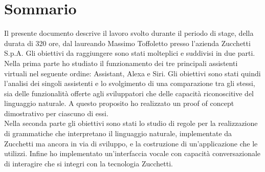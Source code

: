 
\cleardoublepage
{}
{}
\begingroup
\let\clearpage\relax
\let\cleardoublepage\relax
\let\cleardoublepage\relax

\chapter*{Sommario}

Il presente documento descrive il lavoro svolto durante il periodo di stage, della durata di 320 ore, dal laureando Massimo Toffoletto presso l'azienda Zucchetti S.p.A.
Gli obiettivi da raggiungere sono stati molteplici e suddivisi in due parti.\\
Nella prima parte ho studiato il funzionamento dei tre principali assistenti virtuali nel seguente ordine: Assistant, Alexa e Siri. Gli obiettivi sono stati quindi l'analisi dei singoli assistenti e lo svolgimento di una comparazione tra gli stessi, sia delle funzionalità offerte agli sviluppatori che delle capacità riconoscitive del linguaggio naturale. A questo proposito ho realizzato un proof of concept dimostrativo per ciascuno di essi. \\
Nella seconda parte gli obiettivi sono stati lo studio di regole per la realizzazione di grammatiche che interpretano il linguaggio naturale, implementate da Zucchetti ma ancora in via di sviluppo, e la costruzione di un'applicazione che le utilizzi. Infine ho implementato un'interfaccia vocale con capacità conversazionale di interagire che si integri con la tecnologia Zucchetti.

%
%

\endgroup			

\vfill

